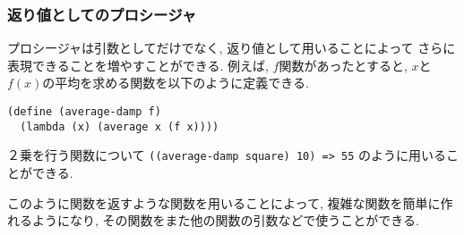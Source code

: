 \setcounter{subsubsection}{3}
\subsubsection{返り値としてのプロシージャ}
プロシージャは引数としてだけでなく, 返り値として用いることによって
さらに表現できることを増やすことができる. 例えば, $f$関数があったとすると,
$x$と$f(x)$の平均を求める関数を以下のように定義できる.

\begin{lstlisting}[basicstyle=\footnotesize]
(define (average-damp f)
  (lambda (x) (average x (f x))))
\end{lstlisting}
\noindent
２乗を行う関数について
\lstinline[basicstyle=\footnotesize]{((average-damp square) 10) => 55}
のように用いることができる.

このように関数を返すような関数を用いることによって, 複雑な関数を簡単に作れるようになり,
その関数をまた他の関数の引数などで使うことができる.
